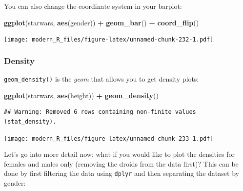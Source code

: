 \documentclass[]{gitbook}
\newenvironment{Shaded}{\begin{snugshade}}{\end{snugshade}}
\newcommand{\KeywordTok}[1]{\textcolor[rgb]{0.13,0.29,0.53}{\textbf{#1}}}
\newcommand{\NormalTok}[1]{#1}
\newcommand{\OperatorTok}[1]{\textcolor[rgb]{0.81,0.36,0.00}{\textbf{#1}}}
\newcommand{\StringTok}[1]{\textcolor[rgb]{0.31,0.60,0.02}{#1}}
\theoremstyle{definition}
\theoremstyle{definition}
\theoremstyle{definition}
\theoremstyle{remark}
\begin{document}
You can also change the coordinate system in your barplot:

\begin{Shaded}
\begin{Highlighting}[]
\KeywordTok{ggplot}\NormalTok{(starwars, }\KeywordTok{aes}\NormalTok{(gender)) }\OperatorTok{+}
\StringTok{  }\KeywordTok{geom_bar}\NormalTok{() }\OperatorTok{+}
\StringTok{  }\KeywordTok{coord_flip}\NormalTok{()}
\end{Highlighting}
\end{Shaded}

\texttt{[image: modern\_R\_files/figure-latex/unnamed-chunk-232-1.pdf]}

\hypertarget{density}{%
\subsubsection{Density}\label{density}}

\texttt{geom\_density()} is the \emph{geom} that allows you to get
density plots:

\begin{Shaded}
\begin{Highlighting}[]
\KeywordTok{ggplot}\NormalTok{(starwars, }\KeywordTok{aes}\NormalTok{(height)) }\OperatorTok{+}
\StringTok{  }\KeywordTok{geom_density}\NormalTok{()}
\end{Highlighting}
\end{Shaded}

\begin{verbatim}
## Warning: Removed 6 rows containing non-finite values (stat_density).
\end{verbatim}

\texttt{[image: modern\_R\_files/figure-latex/unnamed-chunk-233-1.pdf]}

Let's go into more detail now; what if you would like to plot the
densities for females and males only (removing the droids from the data
first)? This can be done by first filtering the data using
\texttt{dplyr} and then separating the dataset by gender:

\begin{Shaded}
\end{Shaded}
\end{document}
